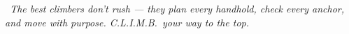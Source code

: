 {\vspace{2mm}

\begin{tcolorbox}[
    enhanced,
    colback=alpPine!5,
    colframe=alpPine!25,
    arc=6pt, boxrule=0.8pt,
    left=5mm, right=5mm, top=3mm, bottom=3mm,
]
    \begin{minipage}[c]{0.07\linewidth}
        \centering \iconOwl[1cm]
    \end{minipage}%
    \hfill
    \begin{minipage}[c]{0.90\linewidth}
        \small\itshape\color{alpSlate}
        \faQuoteLeft~The best climbers don't rush --- they plan
        every handhold, check every anchor, and move
        with purpose. C.L.I.M.B.\ your way to the top.~\faQuoteRight
    \end{minipage}
\end{tcolorbox}

}

\newpage
